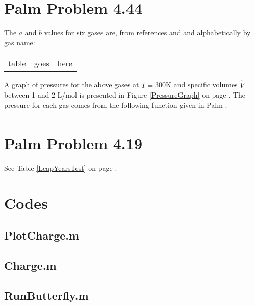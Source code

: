 \documentclass{article}
\begin{document}
\section{Palm Problem 4.44}
\renewcommand{\arraystretch}{1.3}
The $a$ and $b$ values for six gases are, from
references \cite{Palm} and \cite{Other} and alphabetically by gas name:
\begin{center}
\begin{tabular}{ccc}\hline
table & goes & here
\end{tabular}
\end{center}
A graph of pressures for the above gases at $T=$300K and specific volumes $\hat{V}$ between 1 and 2 L/mol is presented in Figure \ref{PressureGraph} on page
\pageref{PressureGraph}.  The pressure for each gas comes from
the following function given in Palm \cite[p.~215]{Palm}:
\begin{align*}
\end{align*}

\section{Palm Problem 4.19}
See Table \ref{LeapYearsTest} on page \pageref{LeapYearsTest}.

\pagebreak
\appendix
\section{Codes}



\subsection{PlotCharge.m}

\subsection{Charge.m}

\subsection{RunButterfly.m}
\end{document}
